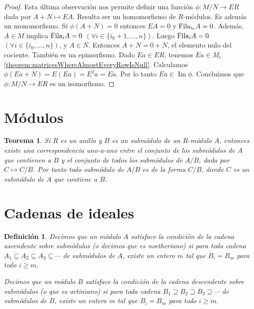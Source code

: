 \documentclass{report}
\newcommand{\Fila}{\textnormal{Fila}}
\DeclareMathOperator{\image}{\text{Im}}
\newtheorem{theorem}{Teorema}
\newtheorem{definition}{Definición}
\begin{document}
\begin{proof}
    Esta última observación nos permite definir una función \(\phi : M / N \rightarrow E R\) dada por \(A + N \mapsto E A\).
    Resulta ser un homomorfismo de \(R\)-módulos.
    Es además un monomorfismo.
    Si \(\phi(A + N) = 0\) entonces \(E A = 0\) y \(\Fila_{i_0} A = 0\).
    Además, \(A \in M\) implica \(\Fila_i A = 0\) \((\forall i \in \{i_0 + 1, \dots, n\})\).
    Luego \(\Fila_i A = 0\) \((\forall i \in \{i_0, \dots, n\})\), y \(A \in N\).
    Entonces \(A + N = 0 + N\), el elemento nulo del cociente.
    También es un epimorfismo.
    Dado \(E a \in E R\), tenemos \(E a \in M_i\) \ref{theorem:matricesWhereAlmostEveryRowIsNull}.
    Calculamos \(\phi(E a + N) = E (E a) = E^2 a = E a\).
    Por lo tanto \(E a \in \image \phi\).
    Concluímos que \(\phi : M / N \rightarrow E R\) es un isomorfismo.
  \end{proof}

  \section{Módulos}
  \begin{theorem}
    \label{theorem:submodulesOfQuotientModule}
    Si \(R\) es un anillo y \(B\) es un submódulo de un \(R\)-módulo \(A\), entonces existe una correspondencia uno-a-uno entre el conjunto de los submódulos de \(A\) que contienen a \(B\) y el conjunto de todos los submódulos de \(A / B\), dada por \(C \mapsto C / B\).
    Por tanto todo submódulo de \(A / B\) es de la forma \(C / B\), donde \(C\) es un submódulo de \(A\) que contiene a \(B\).
  \end{theorem}


  \section{Cadenas de ideales}

  \begin{definition}
    Decimos que un módulo \(A\) satisface la \emph{condición de la cadena ascendente sobre submódulos} (o decimos que es \emph{noetheriano}) si para toda cadena \(A_1 \subseteq A_2 \subseteq A_3 \subseteq \cdots\) de submódulos de \(A\), existe un entero \(m\) tal que \(B_i = B_m\) para todo \(i \geq m\).

    Decimos que un módulo \(B\) satisface la \emph{condición de la cadena descendente sobre submódulos} (o que es \emph{artiniano}) si para toda cadena \(B_1 \supseteq B_2 \supseteq B_3 \supseteq \cdots\) de submódulos de \(B\), existe un entero \(m\) tal que \(B_i = B_m\) para todo \(i \geq m\).
  \end{definition}
\end{document}
